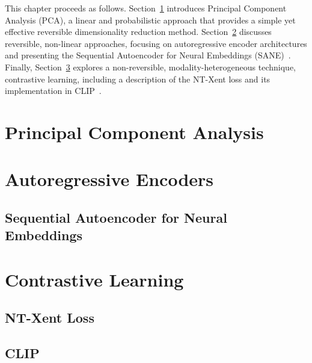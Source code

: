 This chapter proceeds as follows. Section~\ref{sec:pca} introduces Principal Component Analysis (PCA), a linear and probabilistic approach that provides a simple yet effective reversible dimensionality reduction method. Section~\ref{sec:autoencoders} discusses reversible, non-linear approaches, focusing on autoregressive encoder architectures and presenting the Sequential Autoencoder for Neural Embeddings (SANE)~\cite{}. Finally, Section~\ref{sec:contrastive} explores a non-reversible, modality-heterogeneous technique, contrastive learning, including a description of the NT-Xent loss and its implementation in CLIP~\cite{}.

\section{Principal Component Analysis}
\label{sec:pca}

\section{Autoregressive Encoders}
\label{sec:autoencoders}

\subsection{Sequential Autoencoder for Neural Embeddings}

\section{Contrastive Learning}
\label{sec:contrastive}

\subsection{NT-Xent Loss}

\subsection{CLIP}
